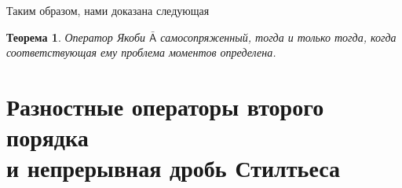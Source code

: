 \documentclass[12pt,a4paper]{article}
\theoremstyle{plain}   \newtheorem{Pro}{Задача}
\newtheorem{The}{Теорема}
\begin{document}
Таким образом, нами доказана следующая
\begin{The}
Оператор Якоби
$ \bar{\mathsf{A}} $
самосопряженный, тогда и только тогда, когда
соответствующая ему проблема моментов определена.
\end{The}
\newpage
\section{Разностные операторы второго порядка\\
и непрерывная дробь Стилтьеса}
\end{document}
